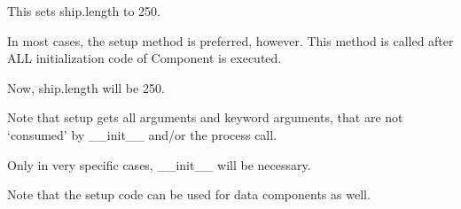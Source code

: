 \documentclass[letterpaper,10pt,english]{sphinxmanual}
\begin{document}
%
\begin{sphinxVerbatim}[commandchars=\\\{\}]
 
        
          
          

  
\end{sphinxVerbatim}

This sets ship.length to 250.

In most cases, the setup method is preferred, however. This method is called after ALL initialization code
of Component is executed.

%
\begin{sphinxVerbatim}[commandchars=\\\{\}]
 
      
          

  
\end{sphinxVerbatim}

Now, ship.length will be 250.

Note that setup gets all arguments and keyword arguments, that are not ‘consumed’  by \_\_init\_\_ and/or
the process call.

Only in very specific cases, \_\_init\_\_ will be necessary.

Note that the setup code can be used for data components as well.
\end{document}
